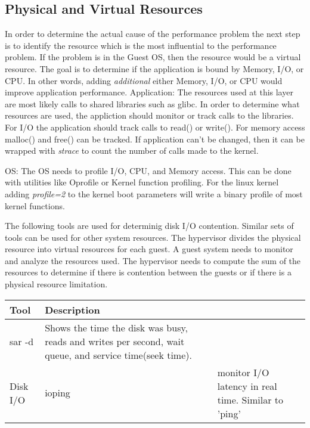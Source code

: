 \subsection{Physical and Virtual Resources}
In order to determine the actual cause of the performance problem the next step is to identify the resource which is the most influential to the performance problem.  If the problem is in the Guest OS, then the resource would be a virtual resource.  The goal is to determine if the application is bound by Memory, I/O, or CPU.  In other words, adding \emph{additional} either Memory, I/O, or CPU would improve application performance.  
\newline
Application:  The resources used at this layer are most likely calls to shared libraries such as glibc.  In order to determine what resources are used, the appliction should monitor or track calls to the libraries.  For I/O the application should track calls to read() or write().  For memory access malloc() and free() can be tracked.  If application can't be changed, then it can be wrapped with \emph{strace} to count the number of calls made to the kernel.

OS:  The OS needs to profile I/O, CPU, and Memory access.  This can be done with utilities like Oprofile or Kernel function profiling.  For the linux kernel adding \emph{profile=2} to the kernel boot parameters will write a binary profile of most kernel functions.  

The following tools are used for determinig disk I/O contention.  Similar sets of tools can be used for other system resources.  The hypervisor divides the physical resource into virtual resources for each guest.  A guest system needs to monitor and analyze the resources used.  The hypervisor needs to compute the sum of the resources to determine if there is contention between the guests or if there is a physical resource limitation.
\begin{tabular}{ l l p{5cm} }
  Tool & Description \\
  \hline
  sar -d & Shows the time the disk was busy, reads and writes per second, wait queue, and service time(seek time). \\
  Disk I/O & ioping & monitor I/O latency in real time. Similar to 'ping'\cite{oping}\\
\end{tabular}

\begin{comment}
  Uniform Memory & vmstat -a & Active and Inactive page statistics \\
  Uniform Memory & vmstat -s & Virtual Memory table \\
  NUMA Memory & zoneinfo & /proc/zoneinfo \\
  CPU & ps -o <FMT> & Real, system, and clock time \\
\end{comment}

